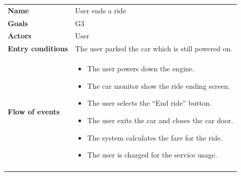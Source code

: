 \documentclass[]{article}
\providecommand{\tightlist}{%
  \setlength{\itemsep}{0pt}\setlength{\parskip}{0pt}}
\begin{document}
\begin{longtable}[]{@{}ll@{}}
\toprule
\begin{minipage}[t]{0.29\columnwidth}\raggedright\strut
\textbf{Name}\strut
\end{minipage} & \begin{minipage}[t]{0.65\columnwidth}\raggedright\strut
User ends a ride\strut
\end{minipage}\tabularnewline
\begin{minipage}[t]{0.29\columnwidth}\raggedright\strut
\textbf{Goals}\strut
\end{minipage} & \begin{minipage}[t]{0.65\columnwidth}\raggedright\strut
G3\strut
\end{minipage}\tabularnewline
\begin{minipage}[t]{0.29\columnwidth}\raggedright\strut
\textbf{Actors}\strut
\end{minipage} & \begin{minipage}[t]{0.65\columnwidth}\raggedright\strut
User\strut
\end{minipage}\tabularnewline
\begin{minipage}[t]{0.29\columnwidth}\raggedright\strut
\textbf{Entry conditions}\strut
\end{minipage} & \begin{minipage}[t]{0.65\columnwidth}\raggedright\strut
The user parked the car which is still powered on.\strut
\end{minipage}\tabularnewline
\begin{minipage}[t]{0.29\columnwidth}\raggedright\strut
\textbf{Flow of events}\strut
\end{minipage} & \begin{minipage}[t]{0.65\columnwidth}\raggedright\strut
\begin{itemize}
\tightlist
\item
  The user powers down the engine.
\item
  The car monitor show the ride ending screen.
\item
  The user selects the ``End ride'' button.
\item
  The user exits the car and closes the car door.
\item
  The system calculates the fare for the ride.
\item
  The user is charged for the service usage.
\end{itemize}\strut
\end{minipage}\tabularnewline
\begin{minipage}[t]{0.29\columnwidth}\raggedright\strut

\end{minipage}
\end{longtable}
\end{document}
